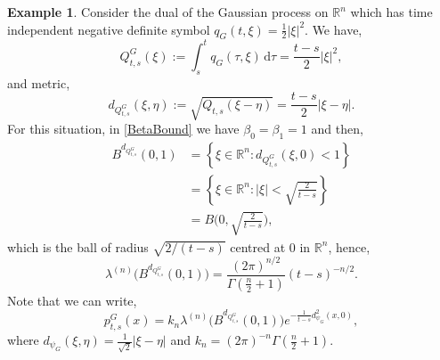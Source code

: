 \documentclass[a4paper, 12pt]{report}
\theoremstyle{cor}
\theoremstyle{remark}
\theoremstyle{definition}
\newtheorem{eg}[theorem]{Example}
\begin{document}
\begin{eg}\label{TDSGMetcE2}
Consider the dual of the Gaussian process on $\mathbb{R}^n$ which has time independent negative definite symbol $q_G(t, \xi) = \frac{1}{2}|\xi|^2$.  We have,
$$
Q_{t, s}^G(\xi) := \int_s^tq_G(\tau, \xi)\,\mathrm{d}\tau = \frac{t -s}{2}|\xi|^2,
$$
and metric,
$$
d_{Q_{t, s}^G}(\xi, \eta) := \sqrt{Q_{t, s}(\xi - \eta)} = \frac{t - s}{2}|\xi - \eta|.
$$
For this situation, in \eqref{BetaBound} we have $\beta_0 = \beta_1 = 1$ and then,
$$
\begin{aligned}
B^{d_{Q_{t, s}^G}}(0, 1) & = \left\{\xi \in \mathbb{R}^n : d_{Q_{t, s}^G}(\xi, 0) < 1\right\}\\
& = \left\{\xi \in \mathbb{R}^n : |\xi| < \sqrt{\frac{2}{t - s}}\right\}\\
& = B\bigg(0, \sqrt{\frac{2}{t - s}}\bigg),
\end{aligned}
$$
which is the ball of radius $\sqrt{2/(t - s)}$ centred at $0$ in $\mathbb{R}^n$, hence,
$$
\lambda^{(n)}\Big(B^{d_{Q_{t, s}^G}}(0, 1)\Big) = \frac{(2\pi)^{n/2}}{\Gamma(\frac{n}{2} + 1)}(t - s)^{-n/2}.
$$
Note that we can write,
$$
p_{t, s}^G(x) = k_n\lambda^{(n)}\Big(B^{d_{Q_{t, s}^G}}(0, 1)\Big)e^{-\frac{1}{t - s}d_{\psi_G}^2(x, 0)},
$$
where $d_{\psi_G}(\xi, \eta) = \frac{1}{\sqrt{2}}|\xi - \eta|$ and $k_n = (2\pi)^{-n}\Gamma(\frac{n}{2} + 1)$.
\end{eg}
\end{document}
